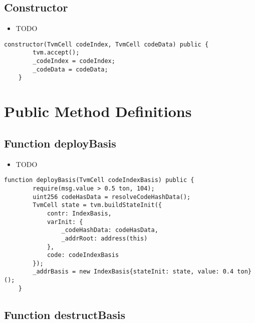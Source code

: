 \subsection{Constructor}

\begin{itemize}
\item TODO
\end{itemize}

\begin{lstlisting}[firstnumber=19]
    constructor(TvmCell codeIndex, TvmCell codeData) public {
        tvm.accept();
        _codeIndex = codeIndex;
        _codeData = codeData;
    }
\end{lstlisting}

\section{Public Method Definitions}


\subsection{Function deployBasis}

\begin{itemize}
\item TODO
\end{itemize}

\begin{lstlisting}[firstnumber=33]
    function deployBasis(TvmCell codeIndexBasis) public {
        require(msg.value > 0.5 ton, 104);
        uint256 codeHasData = resolveCodeHashData();
        TvmCell state = tvm.buildStateInit({
            contr: IndexBasis,
            varInit: {
                _codeHashData: codeHasData,
                _addrRoot: address(this)
            },
            code: codeIndexBasis
        });
        _addrBasis = new IndexBasis{stateInit: state, value: 0.4 ton}();
    }
\end{lstlisting}

\subsection{Function destructBasis}


